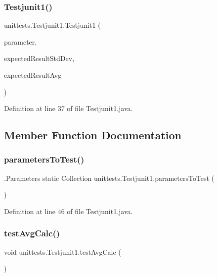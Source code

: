 \subsubsection{\texorpdfstring{Testjunit1()}{Testjunit1()}}
{\footnotesize\ttfamily unittests.\+Testjunit1.\+Testjunit1 (\begin{DoxyParamCaption}\item[{Linked\+List$<$ Double $>$}]{parameter,  }\item[{double}]{expected\+Result\+Std\+Dev,  }\item[{double}]{expected\+Result\+Avg }\end{DoxyParamCaption})}



Definition at line 37 of file Testjunit1.\+java.



\subsection{Member Function Documentation}
\hypertarget{classunittests_1_1_testjunit1_aabef7b871ed456bd558ac96cc1d775e2}{}\label{classunittests_1_1_testjunit1_aabef7b871ed456bd558ac96cc1d775e2} 
\subsubsection{\texorpdfstring{parameters\+To\+Test()}{parametersToTest()}}
{\footnotesize\ttfamily .Parameters static Collection unittests.\+Testjunit1.\+parameters\+To\+Test (\begin{DoxyParamCaption}{ }\end{DoxyParamCaption})\hspace{0.3cm}{\ttfamily [static]}}



Definition at line 46 of file Testjunit1.\+java.

\hypertarget{classunittests_1_1_testjunit1_a622923ae23252a93c4926cf21952f3b0}{}\label{classunittests_1_1_testjunit1_a622923ae23252a93c4926cf21952f3b0} 
\subsubsection{\texorpdfstring{test\+Avg\+Calc()}{testAvgCalc()}}
{\footnotesize\ttfamily void unittests.\+Testjunit1.\+test\+Avg\+Calc (\begin{DoxyParamCaption}{ }\end{DoxyParamCaption})}



